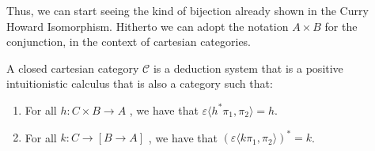 Thus, we can start seeing the kind of bijection already shown in the Curry Howard Isomorphism. Hitherto we can adopt the notation $A\times B$ for the conjunction, in the context of cartesian categories.
\begin{proposition}\label{def2:CCC}
  A closed cartesian category $\mathcal{C}$ is a deduction system that is a positive intuitionistic calculus that is also a category such that:
  \begin{enumerate}
  \item   For all $h: C\times B \to A$ , we have that $\varepsilon \langle h^* \pi_1, \pi_2\rangle = h$.
  \item   For all $k: C\to [B \to A]$ , we have that $(\varepsilon \langle k \pi_1, \pi_2\rangle)^* = k$.
  \end{enumerate}
\end{proposition}

